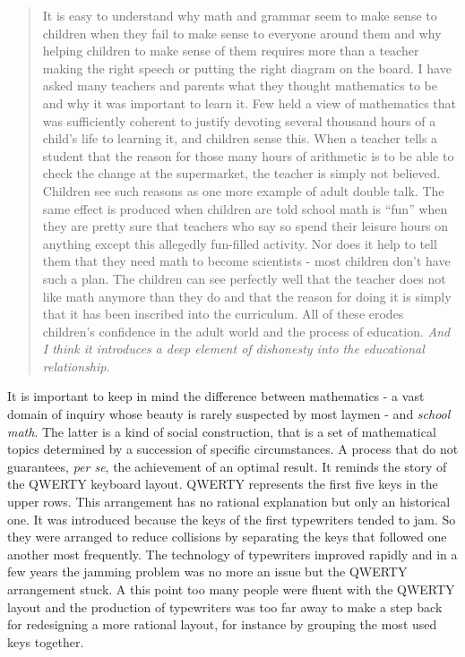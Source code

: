 \begin{quote}
It is easy to understand why math and grammar seem to make sense to children when they fail to make sense to everyone around them and why helping children to make sense of them requires more than a teacher making the right speech or putting the right diagram on the board. I have asked many teachers and parents what they thought mathematics to be and why it was important to learn it. Few held a view of mathematics that was sufficiently coherent to justify devoting several thousand hours of a child's life to learning it, and children sense this. When a teacher tells a student that the reason for those many hours of arithmetic is to be able to check the change at the supermarket, the teacher is simply not believed. Children see such reasons as one more example of adult double talk. The same effect is produced when children are told school math is “fun” when they are pretty sure that teachers who say so spend their leisure hours on anything except this allegedly fun-filled activity. Nor does it help to tell them that they need math to become scientists - most children don't have such a plan. The children can see perfectly well that the teacher does not like math anymore than they do and that the reason for doing it is simply that it has been inscribed into the curriculum.  All of these erodes children's confidence in the adult world and the process of education.  \textit{And I think it introduces a deep element of dishonesty into the educational relationship}.
\end{quote}

It is important to keep in mind the difference between mathematics - a vast domain of inquiry whose beauty is rarely suspected by most laymen - and \textit{school math}. The latter is a kind of social construction, that is a set of mathematical topics determined by a succession of specific circumstances. A process that do not guarantees, \textit{per se}, the achievement of an optimal result. It reminds the story of the QWERTY keyboard layout. QWERTY represents the first five keys in the upper rows. This arrangement has no rational explanation but only an historical one. It was introduced because the keys of the first typewriters tended to jam. So they were arranged to reduce collisions by separating the keys that followed one another most frequently. The technology of typewriters improved rapidly and in a few years the jamming problem was no more an issue but the QWERTY arrangement stuck. A this point too many people were fluent with the QWERTY layout and the production of typewriters was too far away to make a step back for redesigning a more rational layout, for instance by grouping the most used keys together. 

